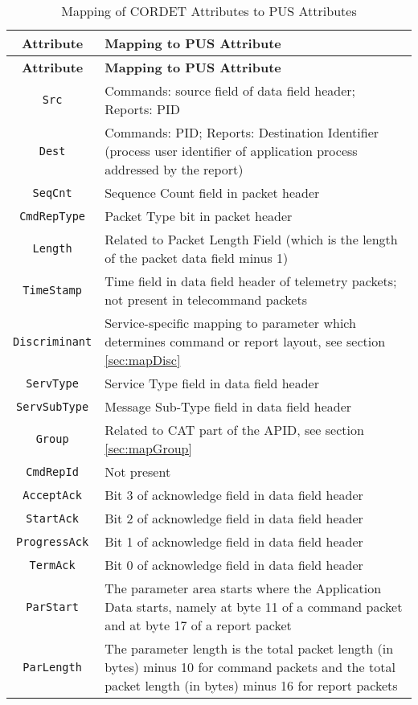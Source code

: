\documentclass{pnp_article}
\begin{document}
\begin{longtable}{|c|>{\raggedright\arraybackslash}p{11cm}|}
\caption{Mapping of CORDET Attributes to PUS Attributes}\label{tab:pcktAttPus} \\
\hline
\rowcolor{light-gray}
\textbf{Attribute} & \textbf{Mapping to PUS Attribute} \\
\hline\hline
\endfirsthead
\rowcolor{light-gray}
\textbf{Attribute} & \textbf{Mapping to PUS Attribute} \\
\hline\hline
\endhead
\texttt{Src} & Commands: source field of data field header; Reports: PID \\
\hline
\texttt{Dest} & Commands: PID; Reports: Destination Identifier (process user identifier of application process addressed by the report)  \\
\hline
\texttt{SeqCnt} & Sequence Count field in packet header \\
\hline
\texttt{CmdRepType} & Packet Type bit in packet header \\
\hline
\texttt{Length} & Related to Packet Length Field (which is the length of the packet data field minus 1) \\
\hline
\texttt{TimeStamp} & Time field in data field header of telemetry packets; not present in telecommand packets \\
\hline
\texttt{Discriminant} & Service-specific mapping to parameter which determines command or report layout, see section \ref{sec:mapDisc} \\
\hline
\texttt{ServType} & Service Type field in data field header \\
\hline
\texttt{ServSubType} & Message Sub-Type field in data field header \\
\hline
\texttt{Group} & Related to CAT part of the APID, see section \ref{sec:mapGroup} \\
\hline
\texttt{CmdRepId} & Not present \\
\hline
\texttt{AcceptAck} & Bit 3 of acknowledge field in data field header \\
\hline
\texttt{StartAck} & Bit 2 of acknowledge field in data field header \\
\hline
\texttt{ProgressAck} & Bit 1 of acknowledge field in data field header \\
\hline
\texttt{TermAck} & Bit 0 of acknowledge field in data field header \\
\hline
\texttt{ParStart} & The parameter area starts where the Application Data starts, namely at byte 11 of a command packet and at byte 17 of a report packet \\
\hline
\texttt{ParLength} & The parameter length is the total packet length (in bytes) minus 10 for command packets and the total packet length (in bytes) minus 16 for report packets \\
\hline
\end{longtable}  
\end{document}
